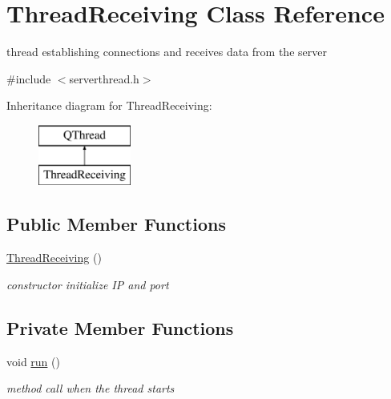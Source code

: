 \hypertarget{class_thread_receiving}{\section{Thread\-Receiving Class Reference}
\label{class_thread_receiving}
}


thread establishing connections and receives data from the server  




{\ttfamily \#include $<$serverthread.\-h$>$}

Inheritance diagram for Thread\-Receiving\-:\begin{figure}[H]
\begin{center}
\leavevmode
\includegraphics[height=2.000000cm]{class_thread_receiving}
\end{center}
\end{figure}
\subsection*{Public Member Functions}
\begin{DoxyCompactItemize}
\item 
\hypertarget{class_thread_receiving_a027544891898af6371f5b113e55ef261}{\hyperlink{class_thread_receiving_a027544891898af6371f5b113e55ef261}{Thread\-Receiving} ()}\label{class_thread_receiving_a027544891898af6371f5b113e55ef261}

\begin{DoxyCompactList}\small\item\em constructor initialize I\-P and port \end{DoxyCompactList}\end{DoxyCompactItemize}
\subsection*{Private Member Functions}
\begin{DoxyCompactItemize}
\item 
\hypertarget{class_thread_receiving_adce995539c66e751f0e6028aac9a2873}{void \hyperlink{class_thread_receiving_adce995539c66e751f0e6028aac9a2873}{run} ()}\label{class_thread_receiving_adce995539c66e751f0e6028aac9a2873}

\begin{DoxyCompactList}\small\item\em method call when the thread starts \end{DoxyCompactList}\end{DoxyCompactItemize}
